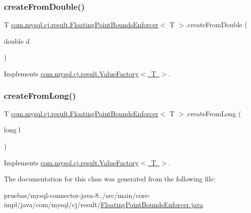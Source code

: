 \subsubsection{\texorpdfstring{create\+From\+Double()}{createFromDouble()}}
{\footnotesize\ttfamily T \mbox{\hyperlink{classcom_1_1mysql_1_1cj_1_1result_1_1_floating_point_bounds_enforcer}{com.\+mysql.\+cj.\+result.\+Floating\+Point\+Bounds\+Enforcer}}$<$ T $>$.create\+From\+Double (\begin{DoxyParamCaption}\item[{double}]{d }\end{DoxyParamCaption})}



Implements \mbox{\hyperlink{interfacecom_1_1mysql_1_1cj_1_1result_1_1_value_factory_a9977e0c9d2bb9e306ee4a5a2ead6840c}{com.\+mysql.\+cj.\+result.\+Value\+Factory$<$ T $>$}}.

\mbox{\label{classcom_1_1mysql_1_1cj_1_1result_1_1_floating_point_bounds_enforcer_adafc614949f2e805f53f8d2c2a84923d}} 
\subsubsection{\texorpdfstring{create\+From\+Long()}{createFromLong()}}
{\footnotesize\ttfamily T \mbox{\hyperlink{classcom_1_1mysql_1_1cj_1_1result_1_1_floating_point_bounds_enforcer}{com.\+mysql.\+cj.\+result.\+Floating\+Point\+Bounds\+Enforcer}}$<$ T $>$.create\+From\+Long (\begin{DoxyParamCaption}\item[{long}]{l }\end{DoxyParamCaption})}



Implements \mbox{\hyperlink{interfacecom_1_1mysql_1_1cj_1_1result_1_1_value_factory_a48c32868f2e3efac502522211a40f642}{com.\+mysql.\+cj.\+result.\+Value\+Factory$<$ T $>$}}.



The documentation for this class was generated from the following file\+:\begin{DoxyCompactItemize}
\item 
pruebas/mysql-\/connector-\/java-\/8../src/main/core-\/impl/java/com/mysql/cj/result/\mbox{\hyperlink{_floating_point_bounds_enforcer_8java}{Floating\+Point\+Bounds\+Enforcer.\+java}}\end{DoxyCompactItemize}
